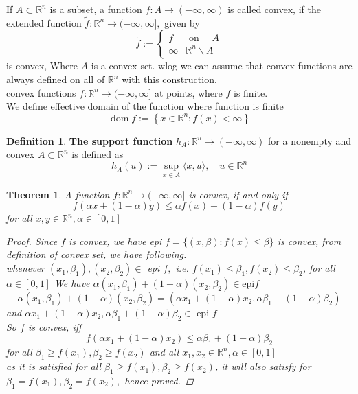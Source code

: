 \documentclass[oneside]{book}
\newtheorem{theorem}{Theorem}[section]
\theoremstyle{definition}
\newtheorem{mydef}{Definition}[chapter]
\begin{document}
 If $A \subset \mathbb{R}^{n}$ is a subset, a function $f: A \rightarrow(-\infty, \infty)$ is called convex, if the extended function $\tilde{f}: \mathbb{R}^{n} \rightarrow(-\infty, \infty],$ given by
$$
\tilde{f}:=\left\{\begin{array}{ll}
f & \text { on } \quad A \\
\infty & \mathbb{R}^{n} \backslash A
\end{array}\right.
$$
is convex,  Where  $A$ is a convex set. wlog we can assume that convex functions are always defined on all of $\mathbb{R}^{n}$ with this construction.\\
convex functions $f: \mathbb{R}^{n} \rightarrow(-\infty, \infty]$ at points, where $f$ is finite. \\
We define effective domain of the function where function is finite
$$
\operatorname{dom} f:=\left\{x \in \mathbb{R}^{n}: f(x)<\infty\right\}
$$



\begin{mydef}
 \textbf{The support function }$h_{A}: \mathbb{R}^{n} \rightarrow(-\infty, \infty) $  for a nonempty and convex $A \subset \mathbb{R}^{n}$ is defined as
$$
h_{A}(u):=\sup _{x \in A}\langle x, u\rangle, \quad u \in \mathbb{R}^{n}
$$

\end{mydef}




\begin{theorem}
\label{t:7}
 A function $f: \mathbb{R}^{n} \rightarrow(-\infty, \infty]$ is convex, if and only if
$$
f(\alpha x+(1-\alpha) y) \leq \alpha f(x)+(1-\alpha) f(y)
$$
for all $x, y \in \mathbb{R}^{n}, \alpha \in[0,1]$
\begin{proof}

Since $f$ is convex, we have epi $f=\{(x, \beta): f(x) \leq \beta\}$ is convex, from definition of convex set, we have following. \\
whenever $\left(x_{1}, \beta_{1}\right),\left(x_{2}, \beta_{2}\right) \in$ epi $f,$ i.e. $f\left(x_{1}\right) \leq \beta_{1}, f\left(x_{2}\right) \leq \beta_{2}$, for all $\alpha \in[0,1]$
 We have
 $\alpha\left(x_{1}, \beta_{1}\right)+(1-\alpha)\left(x_{2}, \beta_{2}\right) \in \text{epi} f$
 $$
\alpha\left(x_{1}, \beta_{1}\right)+(1-\alpha)\left(x_{2}, \beta_{2}\right)=  \left(\alpha x_{1}+(1-\alpha) x_{2}, \alpha \beta_{1}+(1-\alpha) \beta_{2}\right)
$$
and  $ \alpha x_{1}+(1-\alpha) x_{2}, \alpha \beta_{1}+(1-\alpha) \beta_{2} \in \text { epi } f $
\\
So $f$ is convex, iff
$$
f\left(\alpha x_{1}+(1-\alpha) x_{2}\right) \leq \alpha \beta_{1}+(1-\alpha) \beta_{2}
$$
for   all $ \beta_{1} \geq f\left(x_{1}\right), \beta_{2} \geq f\left(x_{2}\right) $ and  all $ x_{1}, x_{2} \in \mathbb{R}^{n}, \alpha \in[0,1]$ \\
as it is satisfied for all $ \beta_{1} \geq f\left(x_{1}\right), \beta_{2} \geq f\left(x_{2}\right) $, it will also satisfy for $\beta_{1}=f\left(x_{1}\right), \beta_{2}=f\left(x_{2}\right),$  hence proved.  
\end{proof}
\end{theorem} 
\end{document}

